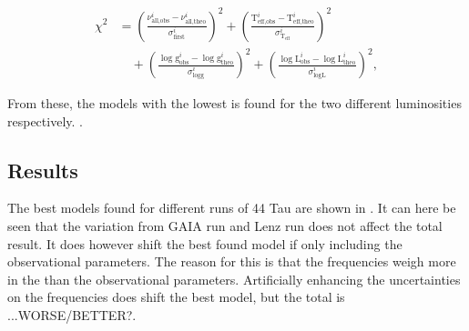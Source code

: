 \begin{align}
\chi^2 &= \left(\frac{\nu_{\text{all,obs}}^i-\nu^i_{\text{all,theo}}}{\sigma^i_{\text{first}}}\right)^2
 +
         \left(\frac{\text{T}_\text{eff,obs}^i-\text{T}_\text{eff,theo}^i}{\sigma^i_{\text{T}_\text{eff}}}\right)^2  \nonumber \\
  & \quad +
\left(\frac{\log \text{g}_\text{obs}^i-\log \text{g}_\text{theo}^i}{\sigma^i_{\log \text{g}}}\right)^2  + \left(\frac{\log \text{L}_\text{obs}^i-\log \text{L}_\text{theo}^i}{\sigma^i_{\log \text{L}}}\right)^2, 
 \label{eq:chis_all}
\end{align}

From these, the models with the lowest \chis is found for the two different luminosities respectively. . 

\subsection{Results}
The best models found for different runs of 44 Tau are shown in . It can here be seen that the variation from GAIA run and Lenz run does not affect the total result. It does however shift the best found model if only including the observational parameters. The reason for this is that the frequencies weigh more in the \chis than the observational parameters. Artificially enhancing the uncertainties on the frequencies does shift the best model, but the total \chis is ...WORSE/BETTER?.

